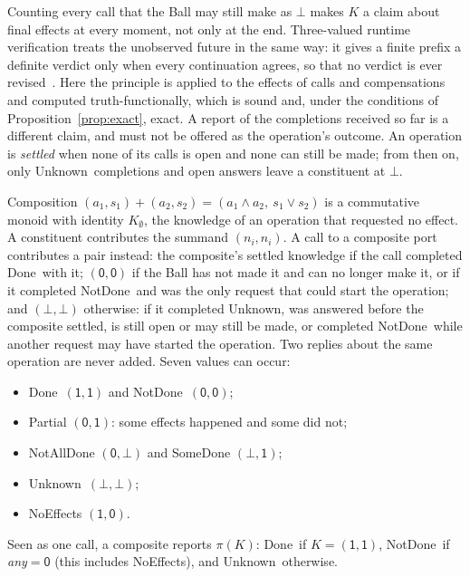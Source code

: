 \documentclass[11pt]{article}
\theoremstyle{definition}
\theoremstyle{plain}
\newcommand{\Done}{\textsf{Done}}
\newcommand{\NotDone}{\textsf{NotDone}}
\newcommand{\Unknown}{\textsf{Unknown}}
\newcommand{\yes}{\mathsf{1}}
\newcommand{\no}{\mathsf{0}}
\newcommand{\mayb}{\bot}
\begin{document}
Counting every call that the Ball may still make as $\mayb$ makes $K$ a claim about final effects at every moment, not only at the end. Three-valued runtime verification treats the unobserved future in the same way: it gives a finite prefix a definite verdict only when every continuation agrees, so that no verdict is ever revised~\citep{BauerLeuckerSchallhart2011,DongLeuckerSchallhart2008}. Here the principle is applied to the effects of calls and compensations and computed truth-functionally, which is sound and, under the conditions of Proposition~\ref{prop:exact}, exact. A report of the completions received so far is a different claim, and must not be offered as the operation's outcome. An operation is \emph{settled} when none of its calls is open and none can still be made; from then on, only \Unknown\ completions and open answers leave a constituent at $\mayb$.

Composition $(a_1,s_1)+(a_2,s_2)=(a_1\wedge a_2,\ s_1\vee s_2)$ is a commutative monoid with identity $K_\emptyset$, the knowledge of an operation that requested no effect. A constituent contributes the summand $(n_i, n_i)$. A call to a composite port contributes a pair instead: the composite's settled knowledge if the call completed \Done\ with it; $(\no,\no)$ if the Ball has not made it and can no longer make it, or if it completed \NotDone\ and was the only request that could start the operation; and $(\mayb,\mayb)$ otherwise: if it completed \Unknown, was answered before the composite settled, is still open or may still be made, or completed \NotDone\ while another request may have started the operation. Two replies about the same operation are never added. Seven values can occur:
\begin{itemize}[nosep]
  \item \Done\ $(\yes,\yes)$ and \NotDone\ $(\no,\no)$;
  \item \textsf{Partial} $(\no,\yes)$: some effects happened and some did not;
  \item \textsf{NotAllDone} $(\no,\mayb)$ and \textsf{SomeDone} $(\mayb,\yes)$;
  \item \Unknown\ $(\mayb,\mayb)$;
  \item \textsf{NoEffects} $(\yes,\no)$.
\end{itemize}
Seen as one call, a composite reports $\pi(K)$: \Done\ if $K=(\yes,\yes)$, \NotDone\ if \emph{any}${}=\no$ (this includes \textsf{NoEffects}), and \Unknown\ otherwise.
\end{document}

